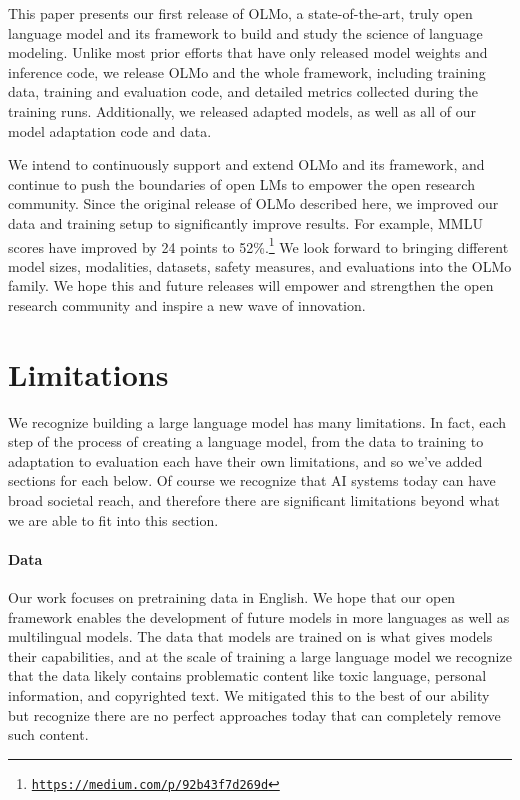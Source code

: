 \documentclass[11pt]{article}
\newcommand{\olmo}{OLMo\xspace}
\begin{document}
This paper presents our first release of  \olmo, a state-of-the-art, truly open language model and its framework to build and study the science of language modeling.
Unlike most prior efforts that have only released model weights and inference code, we release \olmo and the whole framework, including training data, training and evaluation code, and detailed metrics collected during the training runs. 
Additionally, we released adapted models, as well as all of our model adaptation code and data.

We intend to continuously support and extend \olmo and its framework, and continue to push the boundaries of open LMs to empower the open research community.
Since the original release of \olmo described here, we improved our data and training setup to significantly improve results. For example, MMLU scores have improved by 24 points to 52\%.\footnote{
\href{https://blog.allenai.org/olmo-1-7-7b-a-24-point-improvement-on-mmlu-92b43f7d269d}{\nolinkurl{https://medium.com/p/92b43f7d269d}}}
We look forward to bringing different model sizes, modalities, datasets, safety measures, and evaluations into the OLMo family.
We hope this and future releases will empower and strengthen the open research community and inspire a new wave of innovation.

\section*{Limitations}
We recognize building a large language model has many limitations. In fact, each step of the process of creating a language model, from the data to training to adaptation to evaluation each have their own limitations, and so we've added sections for each below. Of course we recognize that AI systems today can have broad societal reach, and therefore there are significant limitations beyond what we are able to fit into this section.

\paragraph{Data}
Our work focuses on pretraining data in English. We hope that our open framework enables the development of future models in more languages as well as multilingual models.
The data that models are trained on is what gives models their capabilities, and at the scale of training a large language model we recognize that the data likely contains problematic content like toxic language, personal information, and copyrighted text.
We mitigated this to the best of our ability but recognize there are no perfect approaches today that can completely remove such content.
\end{document}
